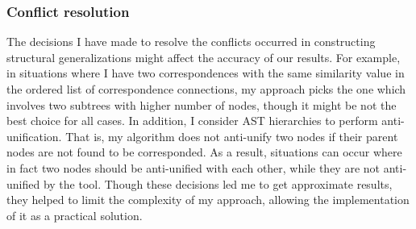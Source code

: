 
\subsubsection{Conflict resolution}  \label{conflicts}
The decisions I have made to resolve the conflicts occurred in constructing structural generalizations might affect the accuracy of our results.
For example, in situations where I have two correspondences with the same similarity value in the ordered list of correspondence connections, my approach picks the one which involves two subtrees with higher number of nodes, though it might be not the best choice for all cases.
In addition, I consider AST hierarchies to perform anti-unification. That is, my algorithm does not anti-unify two nodes if their parent nodes are not found to be corresponded. As a result, situations can occur where in fact two nodes should be anti-unified with each other, while they are not anti-unified by the tool. Though these decisions led me to get approximate results, they helped to limit the complexity of my approach, allowing the implementation of it as a practical solution.








